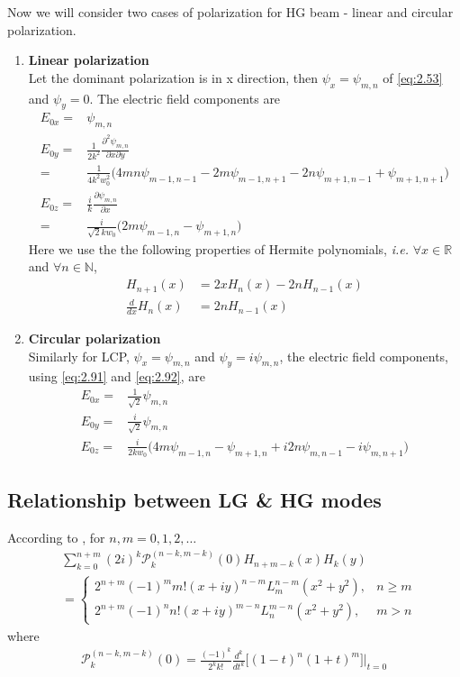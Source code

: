 \documentclass[11pt,a4paper]{article}
\numberwithin{equation}{section}
\begin{document}
Now we will consider two cases of polarization for HG beam - linear and circular polarization.
\begin{enumerate}
	\item 
	\textbf{Linear polarization}\\
	Let the dominant polarization is in x direction, then $\psi_x=\psi_{m,n}$ of \ref{eq:2.53} and $\psi_y=0$. The electric field components are
	\begin{align}
		E_{0x} =&
		\psi_{m,n}\\
		E_{0y} =& 
		\frac{1}{2k^2}\frac{\partial^2 \psi_{m,n}}{\partial x\partial y}\nonumber \\
		=&\frac{1}{4k^2w_0^2} \big( 4mn\psi_{m-1,n-1} - 2m\psi_{m-1,n+1} - 2n\psi_{m+1,n-1} + \psi_{m+1,n+1}\big)\\
		E_{0z} =& 
		\frac{i}{k}\frac{\partial \psi_{m,n}}{\partial x}\nonumber\\
		=& \frac{i}{\sqrt{2}kw_0}\big(2m\psi_{m-1,n} - \psi_{m+1,n}\big)
	\end{align}
	Here we use the the following properties of Hermite polynomials, \cite{levedev} \textit{i.e.} $\forall x\in \mathbb{R}$ and $\forall n\in \mathbb{N}$, 
	\begin{align}
		H_{n+1}(x) &= 2x H_n(x) - 2nH_{n-1}(x)\label{eq:2.91}\\
		\frac{d}{dx}H_n(x)&=2nH_{n-1}(x)\label{eq:2.92}
	\end{align}
	
	\item 
	\textbf{Circular polarization}\\
	Similarly for LCP, $\psi_x=\psi_{m,n}$ and $\psi_y=i\psi_{m,n}$, the electric field components, using \ref{eq:2.91} and \ref{eq:2.92}, are
	\begin{align}
		E_{0x} =&
		\frac{1}{\sqrt{2}}\psi_{m,n}\\
		E_{0y} =& 
		\frac{i}{\sqrt{2}}\psi_{m,n}\\
		E_{0z} =& 
		\frac{i}{2kw_0}\big( 4m\psi_{m-1,n} - \psi_{m+1,n} + i2n\psi_{m,n-1} - i\psi_{m,n+1}\big)
	\end{align}
\end{enumerate}

\subsection{Relationship between LG \& HG modes}
According to \cite{abra 91}, for $n,m = 0,1,2,\dots$
\begin{align}
	&\sum_{k=0}^{n+m}(2i)^k \mathcal{P}_k^{(n-k,m-k)}(0)H_{n+m-k}(x)H_k(y)\nonumber\\
	&=
	\begin{cases}
		2^{n+m}(-1)^m m! (x+iy)^{n-m}L_m^{n-m}(x^2+y^2),& n\ge m\\
		2^{n+m}(-1)^n n! (x+iy)^{m-n}L_n^{m-n}(x^2+y^2),& m > n
	\end{cases}\label{eq:2.96}
\end{align}
where
\begin{align}
	\mathcal{P}_k^{(n-k,m-k)}(0) = \frac{(-1)^k}{2^kk!} \frac{d^k}{dt^k}\big[(1-t)^n(1+t)^m \big] \bigg|_{t=0}
\end{align}
\end{document}
